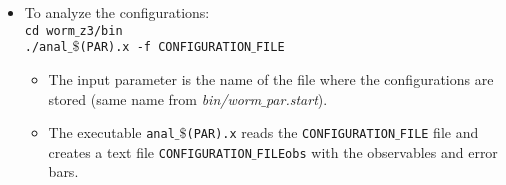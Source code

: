 \documentclass[a4paper,10pt]{report}
\begin{document}
\begin{itemize}[leftmargin=*]
 \item To analyze the configurations:
 \vspace*{2mm}
 \texttt{
 \\cd worm$\_$z3/bin
 \\./anal$\_\$$(PAR).x -f CONFIGURATION$\_$FILE
 }

 \begin{itemize}[leftmargin=*]
  \item The input parameter is the name of the file where the configurations are stored (same
  name from {\it bin/worm$\_$par.start}).
  \item The executable {\tt anal$\_\$$(PAR).x} reads the {\tt CONFIGURATION$\_$FILE} file 
  and creates a text file {\tt CONFIGURATION$\_$FILEobs} with the observables and error bars.
 \end{itemize}

\end{itemize}
\end{document}
